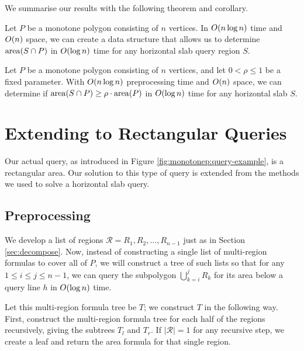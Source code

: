 \noindent
We summarise our results with the following theorem and corollary.

\begin{theorem}
\label{th:montonep:slab-area}
Let $P$ be a monotone polygon consisting of $n$ vertices. In $O\!\left(n \log{n}\right)$ time and $O\!\left(n\right)$ space, we can create a data structure that allows us to determine $\operatorname{area}\!\left(S \cap P\right)$ in $O\!\left(\log{n}\right)$ time for any horizontal slab query region $S$.
\end{theorem}

\begin{corollary}
\label{cor:montonep:slab-mp}
Let $P$ be a monotone polygon consisting of $n$ vertices, and let $0 < \rho \leq 1$ be a fixed parameter. 
With $O\!\left(n \log{n}\right)$ preprocessing time and $O\!\left(n\right)$ space, we can determine if $\operatorname{area}\!\left(S \cap P\right) \geq \rho \cdot \operatorname{area}\!\left(P\right)$ in $O\!\left(\log{n}\right)$ time for any horizontal slab $S$.
\end{corollary}


\section{Extending to Rectangular Queries}
\label{:monotonep:rect}

Our actual query, as introduced in Figure \ref{fig:monotonep:query-example}, is a rectangular area. Our solution to this type of query is extended from the methods we used to solve a horizontal slab query.

\subsection{Preprocessing}
\label{:monotonep:rect:pre}

We develop a list of regions $\mathcal{R} = R_1, R_2, \ldots, R_{n-1}$ just as in Section \ref{sec:decompose}.  Now, instead of constructing a single list of multi-region formulas to cover all of $P$, we will construct a tree of such lists so that for any $1 \leq i \leq j \leq n-1$, we can query the subpolygon $\bigcup_{k=i}^{j}{R_k}$ for its area below a query line $h$ in $O\!\left(\log{n}\right)$ time.

Let this multi-region formula tree be $T$; we construct $T$ in the following way. First, construct the multi-region formula tree for each half of the regions recursively, giving the subtrees $T_l$ and $T_r$. If $|\mathcal{R}| = 1$ for any recursive step, we create a leaf and return the area formula for that single region.

